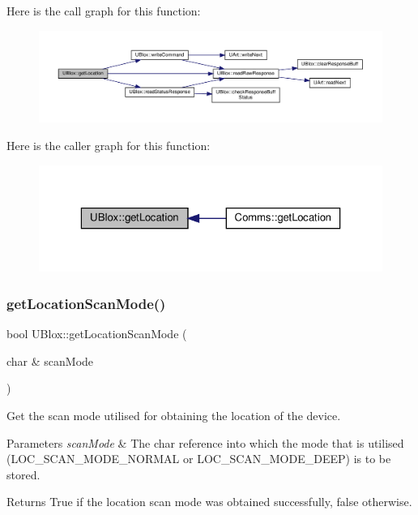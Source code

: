 Here is the call graph for this function\+:
\nopagebreak
\begin{figure}[H]
\begin{center}
\leavevmode
\includegraphics[width=350pt]{da/df6/class_u_blox_a2443d175bbf55a4f4facc5d8a99d2723_cgraph}
\end{center}
\end{figure}
Here is the caller graph for this function\+:
\nopagebreak
\begin{figure}[H]
\begin{center}
\leavevmode
\includegraphics[width=323pt]{da/df6/class_u_blox_a2443d175bbf55a4f4facc5d8a99d2723_icgraph}
\end{center}
\end{figure}
\mbox{\label{class_u_blox_a398db4cdc2d5356fb86b3cd1021bad1b}} 
\subsubsection{\texorpdfstring{get\+Location\+Scan\+Mode()}{getLocationScanMode()}}
{\footnotesize\ttfamily bool U\+Blox\+::get\+Location\+Scan\+Mode (\begin{DoxyParamCaption}\item[{char \&}]{scan\+Mode }\end{DoxyParamCaption})}

Get the scan mode utilised for obtaining the location of the device.


\begin{DoxyParams}{Parameters}
{\em scan\+Mode} & The char reference into which the mode that is utilised (L\+O\+C\+\_\+\+S\+C\+A\+N\+\_\+\+M\+O\+D\+E\+\_\+\+N\+O\+R\+M\+AL or L\+O\+C\+\_\+\+S\+C\+A\+N\+\_\+\+M\+O\+D\+E\+\_\+\+D\+E\+EP) is to be stored. \\
\hline
\end{DoxyParams}
\begin{DoxyReturn}{Returns}
True if the location scan mode was obtained successfully, false otherwise. 
\end{DoxyReturn}


